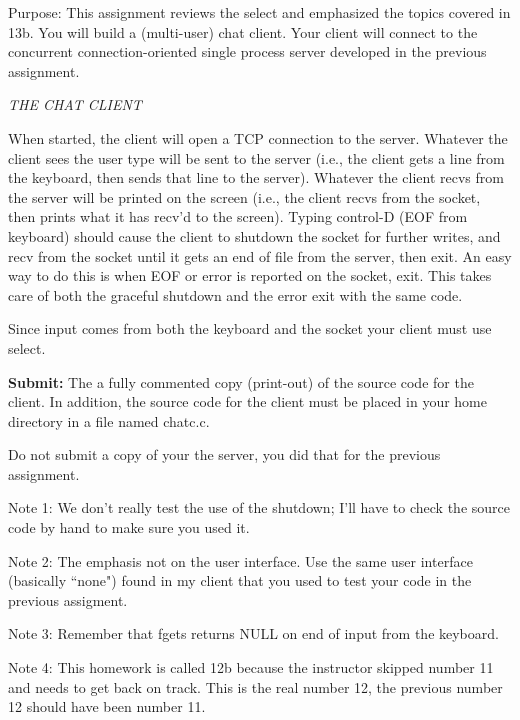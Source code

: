 

\parindent 0pt

Purpose: This assignment reviews the select and emphasized the
topics covered in 13b.
You will build a (multi-user) chat client.
Your client will connect to the concurrent connection-oriented single process
server developed in the previous assignment.

{\it THE CHAT CLIENT}

When started, the client will open a TCP connection to the server.
Whatever the client sees the user type will be sent to the server 
(i.e., the client gets a line from the keyboard, 
then sends that line to the server).
Whatever the client recvs from the server will be printed on the screen
(i.e., the client recvs from the socket, 
then prints what it has recv'd to the screen).
Typing control-D (EOF from keyboard) should cause the client to 
shutdown the socket for further writes, and recv from the socket until
it gets an end of file from the server, then exit.
An easy way to do this is when EOF or error is reported on the socket, exit.
This takes care of both the graceful shutdown and the error exit
with the same code.

Since input comes from both the keyboard and the socket your client
must use select.

{\bf Submit:} The a fully commented copy (print-out) of the source code for the 
client.
In addition,
the source code for the client must be placed in your home directory
in a file named {\ltt{}chatc.c}.

Do not submit a copy of your the server,
you did that for the previous assignment.

Note 1: We don't really test the use of the shutdown; I'll have to
check the source code by hand to make sure you used it.

Note 2: The emphasis not on the user interface.
Use the same user interface (basically ``none") found in my client
that you used to test your code in the previous assigment.

Note 3: Remember that {\ltt{}fgets} returns {\ltt{}NULL} on end
of input from the keyboard.

Note 4: This homework is called 12b because the instructor
skipped number 11 and needs to get back on track.
This is the real number 12, the previous number 12 should have been
number 11.
\bye
